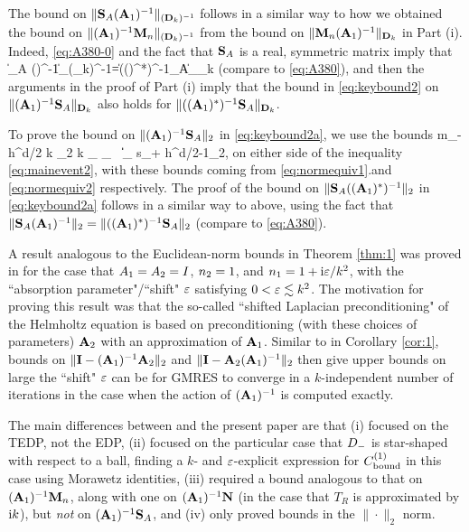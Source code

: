 The bound on $\|\mathbf{S}_A(\mathbf{A}_{1})^{-1}\|_{(\mathbf{D}_k)^{-1}}$ follows in a similar way to how we obtained the 
bound on  $\|(\mathbf{A}_{1})^{-1}\mathbf{M}_n\|_{(\mathbf{D}_k)^{-1}}$ from the bound on $\|\mathbf{M}_n(\mathbf{A}_{1})^{-1}\|_{\mathbf{D}_k}$ in Part (i). Indeed, 
\eqref{eq:A380-0} and the fact that $\mathbf{S}_A$ is a real, symmetric matrix imply that 
\beq\label{eq:A380-2} 
 \big\|\Smat_A (\Amato)^{-1}\big\|_{(\Dmat_k)^{-1}}=\big\|\big((\Amato)^*\big)^{-1}\Smat_A\big\|_{\Dmat_k}
 \eeq 
(compare to \eqref{eq:A380}),
and then the arguments in the proof of Part (i) imply that 
the bound in \eqref{eq:keybound2} on $\|(\mathbf{A}_{1})^{-1}\mathbf{S}_A\|_{\mathbf{D}_k}$ also holds for $\|((\mathbf{A}_{1})^*)^{-1}\mathbf{S}_A\|_{\mathbf{D}_k}$.

To prove the bound on  $\|(\mathbf{A}_{1})^{-1}\mathbf{S}_A\|_{2}$ in \eqref{eq:keybound2a}, we use the bounds 
\beqs
m_- h^{d/2} k \N{\tbu}_2 \leq k _{\LtDR} \leq {}_{\HokDR}
\,\tand\,
\big\|\nabla {}\big\|_{\LtDR} \leq s_+ h^{d/2-1}\N{\bff}_2,
\eeqs
on either side of the inequality \eqref{eq:mainevent2}, with these bounds coming from \eqref{eq:normequiv1}.and \eqref{eq:normequiv2} respectively. The proof of the bound on 
$\|\mathbf{S}_A((\mathbf{A}_{1})^*)^{-1}\|_{2}$ in \eqref{eq:keybound2a} follows in a similar way to above, using the fact that 
$\|\mathbf{S}_A (\mathbf{A}_{1})^{-1}\|_2=\|((\mathbf{A}_{1})^*)^{-1}\mathbf{S}_A\|_2$ (compare to \eqref{eq:A380}).
\epf

A result analogous to the Euclidean-norm bounds in Theorem \ref{thm:1} was proved in \cite{GaGrSp:15} for the case that $A_{1}= A_{2}= I$, $n_{2}= 1$, and $n_{1} = 1 + \mathrm{i}\varepsilon/k^2$, with the ``absorption parameter"/``shift" $\varepsilon$ satisfying $0<\varepsilon\lesssim k^2$. The motivation for proving this result was that the so-called ``shifted Laplacian preconditioning" of the Helmholtz equation is based on preconditioning (with these choices of parameters) $\mathbf{A}_{2}$ with an approximation of $\mathbf{A}_{1}$. Similar to in Corollary \ref{cor:1}, bounds on $\|\mathbf{I} -  (\mathbf{A}_{1})^{-1}\mathbf{A}_{2} \|_2$ and 
$\|\mathbf{I} - \mathbf{A}_{2}  (\mathbf{A}_{1})^{-1}\|_2$
 then give upper bounds on large the ``shift" $\varepsilon$ can be for GMRES to converge in a $k$-independent number of iterations in the case when the action of $(\mathbf{A}_{1})^{-1}$ is computed exactly.

The main differences between \cite{GaGrSp:15} and the present paper are that (i)  \cite{GaGrSp:15} focused on the TEDP, not the EDP,
(ii) \cite{GaGrSp:15} focused on the particular case that $D_{-}$ is star-shaped with respect to a ball, finding a $k$- and $\varepsilon$-explicit expression for $C^{(1)}_{\rm bound}$ in this case using Morawetz identities,
(iii) \cite{GaGrSp:15} required a bound analogous to that on 
$(\mathbf{A}_{1})^{-1}\mathbf{M}_{n}$, along with one on $(\mathbf{A}_{1})^{-1}\mathbf{N}$ (in the case that $T_R$ is approximated by $\mathrm{i} k$), but \emph{not} on 
$(\mathbf{A}_{1})^{-1}\mathbf{S}_{A}$, and (iv) \cite{GaGrSp:15} only proved bounds in the $\|\cdot\|_2$ norm.
\ere

